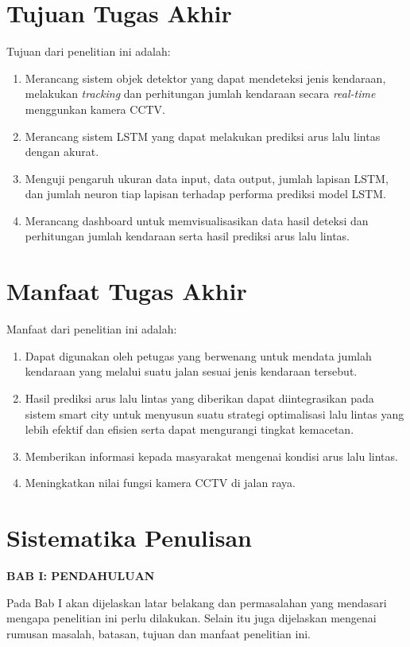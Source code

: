 \documentclass[../thesis.tex]{subfiles}
\begin{document}
\section{Tujuan Tugas Akhir}
Tujuan dari penelitian ini adalah:
\begin{enumerate}
    \item Merancang sistem objek detektor yang dapat mendeteksi jenis kendaraan, melakukan \textit{tracking} dan perhitungan jumlah kendaraan secara \textit{real-time} menggunkan kamera CCTV.
    \item Merancang sistem LSTM yang dapat melakukan prediksi arus lalu lintas dengan akurat.
    \item Menguji pengaruh ukuran data input, data output, jumlah lapisan LSTM, dan jumlah neuron tiap lapisan terhadap performa prediksi model LSTM.
    \item Merancang dashboard untuk memvisualisasikan data hasil deteksi dan perhitungan jumlah kendaraan serta hasil prediksi arus lalu lintas.
\end{enumerate}

\section{Manfaat Tugas Akhir}
Manfaat dari penelitian ini adalah:
\begin{enumerate}
\item Dapat digunakan oleh petugas yang berwenang untuk mendata jumlah kendaraan yang melalui suatu jalan sesuai jenis kendaraan tersebut.
\item Hasil prediksi arus lalu lintas yang diberikan dapat diintegrasikan pada sistem smart city untuk menyusun suatu strategi optimalisasi lalu lintas yang lebih efektif dan efisien serta dapat mengurangi tingkat kemacetan.
\item Memberikan informasi kepada masyarakat mengenai kondisi arus lalu lintas.
\item Meningkatkan nilai fungsi kamera CCTV di jalan raya.
\end{enumerate}

\section{Sistematika Penulisan}
\begin{flushleft}
    \textbf{BAB I: PENDAHULUAN} 
\end{flushleft}
\par
Pada Bab I akan dijelaskan latar belakang dan permasalahan yang mendasari mengapa
penelitian ini perlu dilakukan. Selain itu juga dijelaskan mengenai rumusan masalah, batasan,
tujuan dan manfaat penelitian ini.
\end{document}
